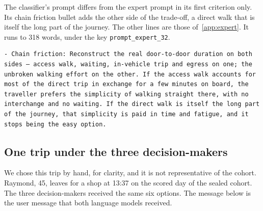 The classifier's prompt differs from the expert prompt in its first criterion only. Its chain
friction bullet adds the other side of the trade-off, a direct walk that is itself the long
part of the journey. The other lines are those of~\ref{app:expert}. It runs to 318
words, under the key \texttt{prompt\_expert\_32}.

\begin{Verbatim}
- Chain friction: Reconstruct the real door-to-door duration on both sides — access walk, waiting, in-vehicle trip and egress on one; the unbroken walking effort on the other. If the access walk accounts for most of the direct trip in exchange for a few minutes on board, the traveller prefers the simplicity of walking straight there, with no interchange and no waiting. If the direct walk is itself the long part of the journey, that simplicity is paid in time and fatigue, and it stops being the easy option.
\end{Verbatim}

\subsection{One trip under the three decision-makers}
\label{app:trip}

We chose this trip by hand, for clarity, and it is not representative of the cohort.
Raymond, 45, leaves for a shop at 13:37 on the scored day of the sealed cohort. The three
decision-makers received the same six options. The message below is the user message that
both language models received.

